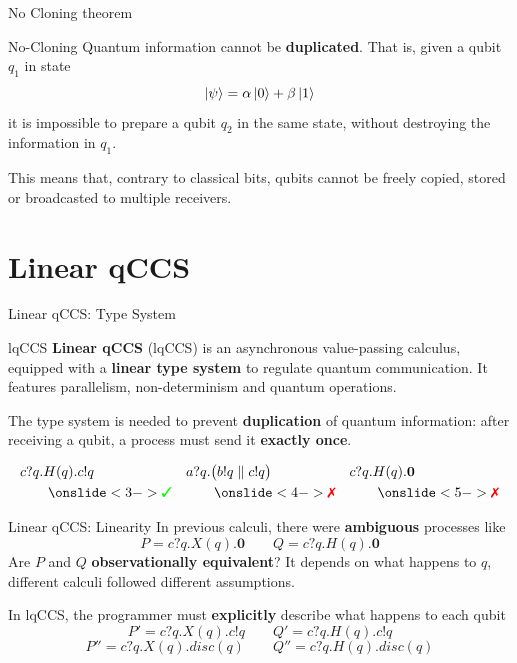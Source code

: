 \documentclass{beamer}
\newcommand{\cmark}{{\color{green} \text{\ding{51}}}}%
\newcommand{\xmark}{{\color{red} \text{\ding{55}}}}%
\newcommand{\kp}{\ket{\psi}}
\newcommand{\kz}{\ket{0}}
\newcommand{\ko}{\ket{1}}
\newcommand{\nil}{\mathbf{0}}
\begin{document}
\begin{frame}{No Cloning theorem}
\begin{block}{No-Cloning}
Quantum information cannot be \textbf{duplicated}. That is, given a qubit $q_1$ in state $$\kp = \alpha\kz + \beta\ko$$ it is impossible to prepare a qubit $q_2$ in the same state, without destroying the information in $q_1$.
\end{block}

\bigskip
This means that, contrary to classical bits, qubits cannot be freely copied, stored or broadcasted to multiple receivers.
\end{frame}


\section{Linear qCCS}
\begin{frame}{Linear qCCS: Type System}
\begin{block}{lqCCS}
\textbf{Linear qCCS} (lqCCS) is an asynchronous value-passing calculus, equipped with a \textbf{linear type system} to regulate quantum communication. It features parallelism, non-determinism and quantum operations.
\end{block}

\bigskip

\pause
The type system is needed to prevent \textbf{duplication} of quantum information: after receiving a qubit, a process must send it \textbf{exactly once}. 

\begin{align*}
& c?q.H(q).c!q  & &  a?q.\big(b!q \parallel c!q\big) \  & & c?q.H(q).\nil \  \\
& \qquad\onslide<3->{\cmark}  & & \qquad\onslide<4->{\xmark} & & \qquad\onslide<5->{\xmark}
\end{align*}

\end{frame}

\begin{frame}{Linear qCCS: Linearity}
In previous calculi, there were \textbf{ambiguous} processes like 
\[
 P = c?q.X(q).\nil \qquad Q = c?q.H(q).\nil
\]
\pause
Are $P$ and $Q$ \textbf{observationally equivalent}? It depends on what happens to $q$, different calculi followed different assumptions.

\bigskip

\pause
In lqCCS, the programmer must \textbf{explicitly} describe what happens to each qubit
\[
 P' = c?q.X(q).c!q \qquad Q' = c?q.H(q).c!q
\]
\[
 P'' = c?q.X(q).disc(q) \qquad Q'' = c?q.H(q).disc(q)
\]
\end{frame}
\end{document}
